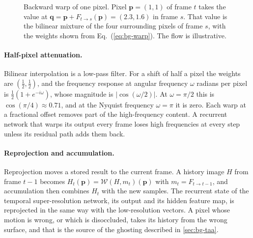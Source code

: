 \begin{figure}[!htbp]
\centering
{}
\caption{Backward warp of one pixel. Pixel $\mathbf p=(1,1)$ of frame $t$ takes the value at $\mathbf q=\mathbf p+F_{t\to s}(\mathbf p)=(2.3,1.6)$ in frame $s$. That value is the bilinear mixture of the four surrounding pixels of frame $s$, with the weights shown from Eq.~(\ref{eq:bg-warp}). The flow is illustrative.}\label{fig:bg-warp}
\end{figure}

\paragraph{Half-pixel attenuation.} Bilinear interpolation is a low-pass filter. For a shift of half a pixel the weights are $(\tfrac12,\tfrac12)$, and the frequency response at angular frequency $\omega$ radians per pixel is $\tfrac12(1+e^{-i\omega})$, whose magnitude is $|\cos(\omega/2)|$. At $\omega=\pi/2$ this is $\cos(\pi/4)\approx0.71$, and at the Nyquist frequency $\omega=\pi$ it is zero. Each warp at a fractional offset removes part of the high-frequency content. A recurrent network that warps its output every frame loses high frequencies at every step unless its residual path adds them back.

\paragraph{Reprojection and accumulation.} Reprojection moves a stored result to the current frame. A history image $H$ from frame $t-1$ becomes $H_t(\mathbf p)=\mathcal W(H,m_t)(\mathbf p)$ with $m_t=F_{t\to t-1}$, and accumulation then combines $H_t$ with the new samples. The recurrent state of the temporal super-resolution network, its output and its hidden feature map, is reprojected in the same way with the low-resolution vectors. A pixel whose motion is wrong, or which is disoccluded, takes its history from the wrong surface, and that is the source of the ghosting described in \cref{sec:bg-taa}.

